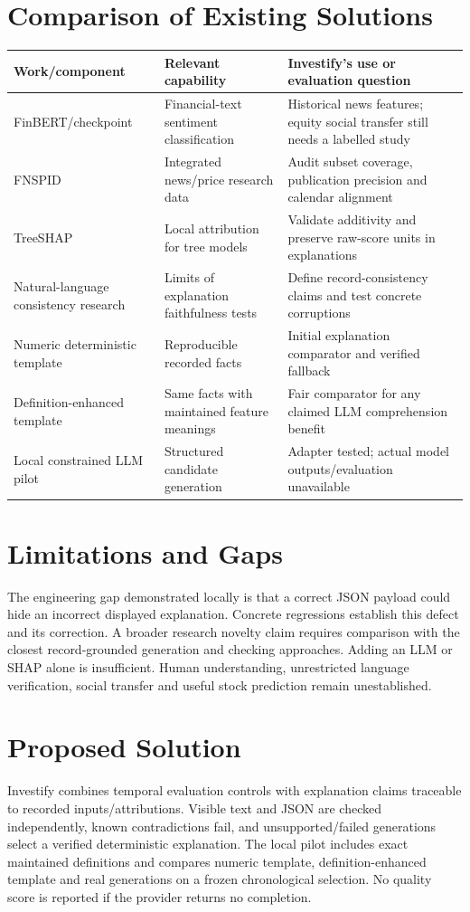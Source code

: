 \section{Comparison of Existing Solutions}
\begin{longtable}{p{}p{}p{}}
\toprule Work/component & Relevant capability & Investify's use or evaluation question\\\midrule
FinBERT/checkpoint & Financial-text sentiment classification & Historical news features; equity social transfer still needs a labelled study\\
FNSPID & Integrated news/price research data & Audit subset coverage, publication precision and calendar alignment\\
TreeSHAP & Local attribution for tree models & Validate additivity and preserve raw-score units in explanations\\
Natural-language consistency research & Limits of explanation faithfulness tests & Define record-consistency claims and test concrete corruptions\\
Numeric deterministic template & Reproducible recorded facts & Initial explanation comparator and verified fallback\\
Definition-enhanced template & Same facts with maintained feature meanings & Fair comparator for any claimed LLM comprehension benefit\\
Local constrained LLM pilot & Structured candidate generation & Adapter tested; actual model outputs/evaluation unavailable\\
\bottomrule
\end{longtable}
\section{Limitations and Gaps}
The engineering gap demonstrated locally is that a correct JSON payload could hide an incorrect displayed explanation. Concrete regressions establish this defect and its correction. A broader research novelty claim requires comparison with the closest record-grounded generation and checking approaches. Adding an LLM or SHAP alone is insufficient. Human understanding, unrestricted language verification, social transfer and useful stock prediction remain unestablished.
\section{Proposed Solution}
Investify combines temporal evaluation controls with explanation claims traceable to recorded inputs/attributions. Visible text and JSON are checked independently, known contradictions fail, and unsupported/failed generations select a verified deterministic explanation. The local pilot includes exact maintained definitions and compares numeric template, definition-enhanced template and real generations on a frozen chronological selection. No quality score is reported if the provider returns no completion.
